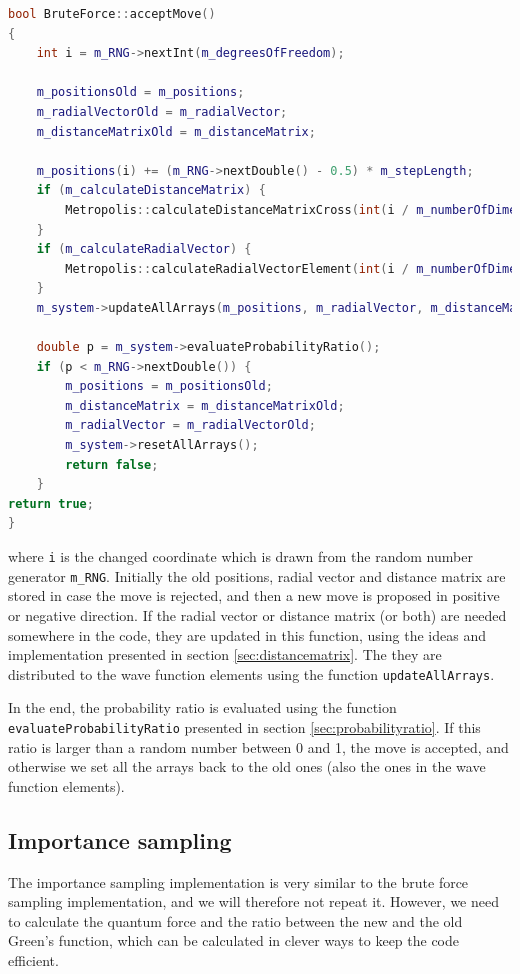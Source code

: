 \begin{lstlisting}[language=c++,caption={Taken from \lstinline{bruteforce.cpp}.}]
bool BruteForce::acceptMove()
{
	int i = m_RNG->nextInt(m_degreesOfFreedom);

	m_positionsOld = m_positions;
	m_radialVectorOld = m_radialVector;
	m_distanceMatrixOld = m_distanceMatrix;

	m_positions(i) += (m_RNG->nextDouble() - 0.5) * m_stepLength;
	if (m_calculateDistanceMatrix) {
		Metropolis::calculateDistanceMatrixCross(int(i / m_numberOfDimensions));
	}
	if (m_calculateRadialVector) {
		Metropolis::calculateRadialVectorElement(int(i / m_numberOfDimensions));
	}
	m_system->updateAllArrays(m_positions, m_radialVector, m_distanceMatrix, i);

	double p = m_system->evaluateProbabilityRatio();
	if (p < m_RNG->nextDouble()) {
		m_positions = m_positionsOld;
		m_distanceMatrix = m_distanceMatrixOld;
		m_radialVector = m_radialVectorOld;
		m_system->resetAllArrays();
		return false;
	}
return true;
}
\end{lstlisting}
where \lstinline|i| is the changed coordinate which is drawn from the random number generator \lstinline|m_RNG|. Initially the old positions, radial vector and distance matrix are stored in case the move is rejected, and then a new move is proposed in positive or negative direction. If the radial vector or distance matrix (or both) are needed somewhere in the code, they are updated in this function, using the ideas and implementation presented in section \ref{sec:distancematrix}. The they are distributed to the wave function elements using the function \lstinline|updateAllArrays|.

In the end, the probability ratio is evaluated using the function \lstinline|evaluateProbabilityRatio| presented in section \ref{sec:probabilityratio}. If this ratio is larger than a random number between 0 and 1, the move is accepted, and otherwise we set all the arrays back to the old ones (also the ones in the wave function elements). 

\subsection{Importance sampling}
The importance sampling implementation is very similar to the brute force sampling implementation, and we will therefore not repeat it. However, we need to calculate the quantum force and the ratio between the new and the old Green's function, which can be calculated in clever ways to keep the code efficient. 

